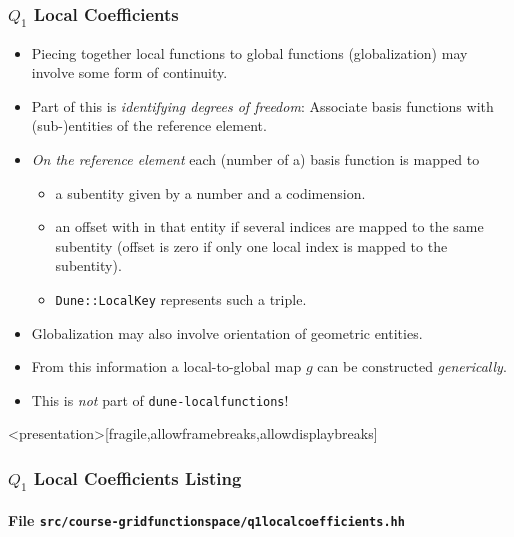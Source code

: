 \begin{frame}
\frametitle{$Q_1$ Local Coefficients}
\begin{itemize}
\item Piecing together local functions to global functions (globalization)
may involve some form of continuity.
\item Part of this is \textit{identifying degrees of freedom}:
Associate basis functions with 
(sub-)entities of the reference element.
\item \textit{On the reference element} each (number of a) basis function is 
mapped to
\begin{itemize}
\item a subentity given by a number and a codimension.
\item an offset with in that entity if several indices are mapped to
the same subentity (offset is zero if only one local index is mapped
to the subentity). 
\item \lstinline{Dune::LocalKey} represents such a triple.
\end{itemize} 
\item Globalization may also involve orientation of geometric entities.
\item From this information a local-to-global map $g$ can be
constructed \textit{generically}. 
\item This is \textit{not} part of \lstinline{dune-localfunctions}!
\end{itemize}
\end{frame}

\begin{frame}<presentation>[fragile,allowframebreaks,allowdisplaybreaks]
\frametitle<presentation>{$Q_1$ Local Coefficients Listing}
\framesubtitle<presentation>{File \texttt{src/course-gridfunctionspace/q1localcoefficients.hh}}

\end{frame}


